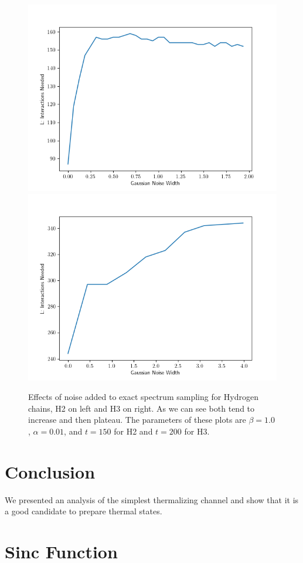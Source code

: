 \documentclass{article}
\begin{document}
\begin{figure}
    \centering
    \includegraphics[width=0.475\linewidth]{numerics/data/h_chain_with_noise_1.png}
    \includegraphics[width=0.475\linewidth]{numerics/data/h_chain_3_with_noise_2.png}
    \caption{Effects of noise added to exact spectrum sampling for Hydrogen chains, H2 on left and H3 on right. As we can see both tend to increase and then plateau. The parameters of these plots are $\beta = 1.0$, $\alpha = 0.01$, and $t = 150$ for H2 and $t = 200$ for H3.}
    \label{fig:h_chain_with_noise}
\end{figure}

\section{Conclusion}

We presented an analysis of the simplest thermalizing channel and show that it is a good candidate to prepare thermal states.




\appendix



\section{Sinc Function}
\end{document}
